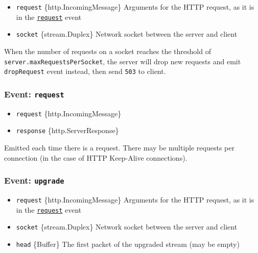 \begin{itemize}
\tightlist
\item
  \texttt{request} \{http.IncomingMessage\} Arguments for the HTTP
  request, as it is in the
  \hyperref[event-request]{\texttt{\textquotesingle{}request\textquotesingle{}}}
  event
\item
  \texttt{socket} \{stream.Duplex\} Network socket between the server
  and client
\end{itemize}

When the number of requests on a socket reaches the threshold of
\texttt{server.maxRequestsPerSocket}, the server will drop new requests
and emit \texttt{\textquotesingle{}dropRequest\textquotesingle{}} event
instead, then send \texttt{503} to client.

\subsubsection{\texorpdfstring{Event:
\texttt{\textquotesingle{}request\textquotesingle{}}}{Event: \textquotesingle request\textquotesingle{}}}\label{event-request}

\begin{itemize}
\tightlist
\item
  \texttt{request} \{http.IncomingMessage\}
\item
  \texttt{response} \{http.ServerResponse\}
\end{itemize}

Emitted each time there is a request. There may be multiple requests per
connection (in the case of HTTP Keep-Alive connections).

\subsubsection{\texorpdfstring{Event:
\texttt{\textquotesingle{}upgrade\textquotesingle{}}}{Event: \textquotesingle upgrade\textquotesingle{}}}\label{event-upgrade-1}

\begin{itemize}
\tightlist
\item
  \texttt{request} \{http.IncomingMessage\} Arguments for the HTTP
  request, as it is in the
  \hyperref[event-request]{\texttt{\textquotesingle{}request\textquotesingle{}}}
  event
\item
  \texttt{socket} \{stream.Duplex\} Network socket between the server
  and client
\item
  \texttt{head} \{Buffer\} The first packet of the upgraded stream (may
  be empty)
\end{itemize}

